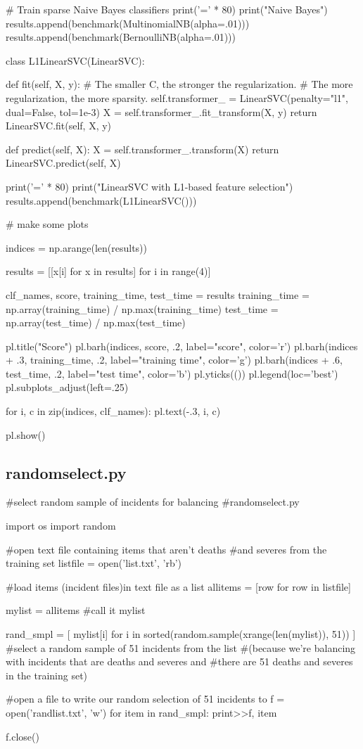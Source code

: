 \begin{pyverbatim}
# Train sparse Naive Bayes classifiers
print('=' * 80)
print("Naive Bayes")
results.append(benchmark(MultinomialNB(alpha=.01)))
results.append(benchmark(BernoulliNB(alpha=.01)))


class L1LinearSVC(LinearSVC):

    def fit(self, X, y):
        # The smaller C, the stronger the regularization.
        # The more regularization, the more sparsity.
        self.transformer_ = LinearSVC(penalty="l1",
                                      dual=False, tol=1e-3)
        X = self.transformer_.fit_transform(X, y)
        return LinearSVC.fit(self, X, y)

    def predict(self, X):
        X = self.transformer_.transform(X)
        return LinearSVC.predict(self, X)

print('=' * 80)
print("LinearSVC with L1-based feature selection")
results.append(benchmark(L1LinearSVC()))


# make some plots

indices = np.arange(len(results))

results = [[x[i] for x in results] for i in range(4)]

clf_names, score, training_time, test_time = results
training_time = np.array(training_time) / np.max(training_time)
test_time = np.array(test_time) / np.max(test_time)

pl.title("Score")
pl.barh(indices, score, .2, label="score", color='r')
pl.barh(indices + .3, training_time, .2, label="training time", color='g')
pl.barh(indices + .6, test_time, .2, label="test time", color='b')
pl.yticks(())
pl.legend(loc='best')
pl.subplots_adjust(left=.25)

for i, c in zip(indices, clf_names):
    pl.text(-.3, i, c)

pl.show()
\end{pyverbatim}

\subsection{randomselect.py}
\label{randomselect.py}
\begin{pyverbatim}
#select random sample of incidents for balancing
#randomselect.py

import os
import random

#open text file containing items that aren't deaths 
#and severes from the training set
listfile = open('list.txt', 'rb') 

#load items (incident files)in text file as a list
allitems = [row for row in listfile] 

mylist = allitems #call it mylist

rand_smpl = [ mylist[i] for i in sorted(random.sample(xrange(len(mylist)), 51)) ] 
#select a random sample of 51 incidents from the list 
#(because we're balancing with incidents that are deaths and severes and 
#there are 51 deaths and severes in the training set)

#open a file to write our random selection of 51 incidents to
f = open('randlist.txt', 'w') 
for item in rand_smpl:
     print>>f, item
    
f.close()
\end{pyverbatim}

